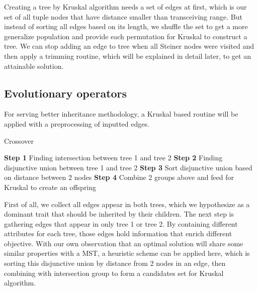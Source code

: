 Creating a tree by Kruskal algorithm needs a set of edges at first, which is our set of all tuple nodes that have distance smaller than transceiving range. But instead of sorting all edges based on its length, we shuffle the set to get a more generalize population and provide each permutation for Kruskal to construct a tree. We can stop adding an edge to tree when all Steiner nodes were visited and then apply a trimming routine, which will be explained in detail later, to get an attainable solution.

\subsection{Evolutionary operators}
For serving better inheritance methodology, a Kruskal based routine will be applied with a preprocessing of inputted edges.

\begin{algorithm}
\caption{Crossover}
\begin{algorithmic}[0]
\State \textbf{Step 1} Finding intersection between tree 1 and tree 2
\State \textbf{Step 2} Finding disjunctive union between tree 1 and tree 2
\State \textbf{Step 3} Sort disjunctive union based on distance between 2 nodes
\State \textbf{Step 4} Combine 2 groups above and feed for Kruskal to create an offspring
\end{algorithmic}
\end{algorithm}

First of all, we collect all edges appear in both trees, which we hypothesize as a dominant trait that should be inherited by their children. The next step is gathering edges that appear in only tree 1 or tree 2. By containing different attributes for each tree, those edges hold information that enrich different objective. With our own observation that an optimal solution will share some similar properties with a MST, a heuristic scheme can be applied here, which is sorting this disjunctive union by distance from 2 nodes in an edge, then combining with intersection group to form a candidates set for Kruskal algorithm.

\noindent{}

